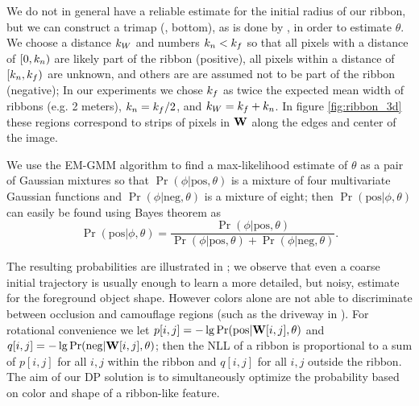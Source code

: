 We do not in general have a reliable estimate for the initial radius of our ribbon, 
but we can construct a trimap (, bottom), as is done by \GrabCut{}, in order to estimate $\theta$. We choose a distance $k_W$ and numbers $k_n < k_f$ 
so that all pixels with a distance of $[0, k_n)$ are likely part of the ribbon (positive), all pixels within a distance of $[k_n, k_f)$ are unknown, and others are are assumed not to be part of the ribbon (negative); 
In our experiments we chose  $k_f$ as twice the expected mean width of ribbons (e.g. 2 meters), $k_n = k_f/2$, and $k_W=k_f+k_n$.  
In figure \ref{fig:ribbon_3d} these regions correspond to strips of pixels in $\mathbf{W}{}$ along the edges and center of the image.


We use the EM-GMM algorithm to find a max-likelihood estimate of $\theta$ as a pair of Gaussian mixtures so that $\Pr(\phi|\text{pos}, \theta)$ is a mixture of four multivariate Gaussian functions and $\Pr(\phi|\text{neg}, \theta)$ is a mixture of eight; then $\Pr(\text{pos}|\phi, \theta)$ can easily be found using Bayes theorem as 
$$\Pr(\text{pos}|\phi, \theta)= \frac{\Pr(\phi|\text{pos}, \theta)}{\Pr(\phi|\text{pos}, \theta)+\Pr(\phi|\text{neg}, \theta)}.$$




The resulting probabilities are illustrated in ; we observe that even a coarse initial trajectory is usually enough to learn a more detailed, but noisy, estimate for the foreground object shape. However colors alone are not able to discriminate between occlusion and camouflage regions (such as the driveway in ). For rotational convenience we let $p[i,j]=-\lg \Pr(\text{pos}|\mathbf{W}{}[i,j], \theta)$ and $q[i,j]=-\lg \Pr(\text{neg}|\mathbf{W}{}[i,j], \theta)$; then the \ac{NLL} of a ribbon is proportional to a sum of $p[i,j]$ for all $i,j$ within the ribbon and $q[i,j]$ for all $i,j$ outside the ribbon. The aim of our \ac{DP} solution is to simultaneously optimize the probability based on color and shape of a ribbon-like feature. 


